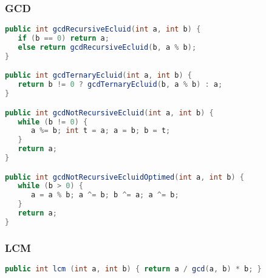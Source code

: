 \subsubsection{GCD}

\begin{lstlisting}[language=Java]
public int gcdRecursiveEcluid(int a, int b) {
   if (b == 0) return a;
   else return gcdRecursiveEcluid(b, a % b);
}

public int gcdTernaryEcluid(int a, int b) {
   return b != 0 ? gcdTernaryEcluid(b, a % b) : a;
}

public int gcdNotRecursiveEcluid(int a, int b) {
   while (b != 0) {
      a %= b; int t = a; a = b; b = t;
   }
   return a;
}

public int gcdNotRecursiveEcluidOptimed(int a, int b) {
   while (b > 0) {
      a = a % b; a ^= b; b ^= a; a ^= b;
   }
   return a;
}	
\end{lstlisting}

\subsubsection{LCM}
\begin{lstlisting}[language=Java]
public int lcm (int a, int b) { return a / gcd(a, b) * b; }
\end{lstlisting}